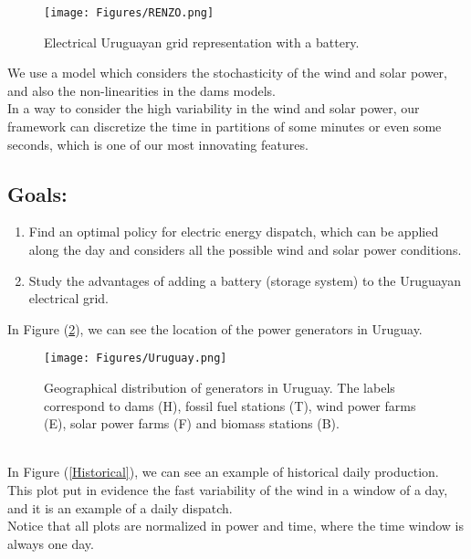 \documentclass[ima, 20pt, portrait, plainboxedsections]{sciposter}
\begin{document}
\begin{multicols}{3}
\begin{enumerate}
\end{enumerate}

\begin{figure}[ht!]
\centering
\texttt{[image: Figures/RENZO.png]}
\caption{Electrical Uruguayan grid representation with a battery.}
\label{Grid_Uy}
\end{figure}

We use a model which considers the stochasticity of the wind and solar power, and also the non-linearities in the dams models.\\
In a way to consider the high variability in the wind and solar power, our framework can discretize the time in partitions of some minutes or even some seconds, which is one of our most innovating features.

\subsection*{{\color{red}Goals:}}

\begin{enumerate}

\item[{\color{red}(1)}] Find an optimal policy for electric energy dispatch, which can be applied along the day and considers all the possible wind and solar power conditions.

\item[{\color{red}(2)}] Study the advantages of adding a battery (storage system) to the Uruguayan electrical grid.

\end{enumerate}

In Figure (\ref{Map_Uy}), we can see the location of the power generators in Uruguay.

\begin{figure}[ht!]
\centering
\texttt{[image: Figures/Uruguay.png]}
\caption{Geographical distribution of generators in Uruguay. The labels correspond to dams (H), fossil fuel stations (T), wind power farms (E), solar power farms (F) and biomass stations (B).}
\label{Map_Uy}
\end{figure}\\

In Figure (\ref{Historical}), we can see an example of historical daily production. This plot put in evidence the fast variability of the wind in a window of a day, and it is an example of a daily dispatch.\\
Notice that all plots are normalized in power and time, where the time window is always one day.


\end{multicols}
\end{document}
